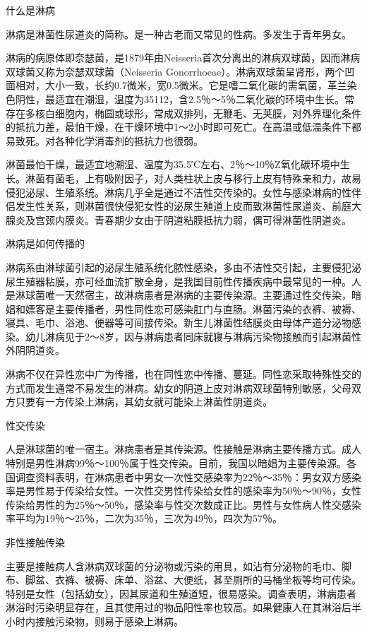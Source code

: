 \documentclass[12pt,UTF8]{ctexbook}
\begin{document}
什么是淋病


淋病是淋菌性尿道炎的简称。是一种古老而又常见的性病。多发生于青年男女。

淋病的病原体即奈瑟菌，是1879年由Neisseria首次分离出的淋病双球菌，因而淋病双球菌又称为奈瑟双球菌（Neisseria Gonorrhoeae）。淋病双球菌呈肾形，两个凹面相对，大小一致，长约0.7微米，宽0.5微米。它是嗜二氧化碳的需氧菌，革兰染色阴性，最适宜在潮湿，温度为35112，含2.5％～5％二氧化碳的环境中生长。常存在多核白细胞内，椭圆或球形，常成双排列，无鞭毛、无荚膜，对外界理化条件的抵抗力差，最怕干燥，在干燥环境中1～2小时即可死亡。在高温或低温条件下都易致死。对各种化学消毒剂的抵抗力也很弱。

淋菌最怕干燥，最适宜地潮湿、温度为35.5℃左右、2％～10％Z氧化碳环境中生长。淋菌有菌毛，上有吸附因子，对人类柱状上皮与移行上皮有特殊亲和力，故易侵犯泌尿、生殖系统。淋病几乎全是通过不洁性交传染的。女性与感染淋病的性伴侣发生性关系，则淋菌很快侵犯女性的泌尿生殖道上皮而致淋菌性尿道炎、前庭大腺炎及宫颈内膜炎。青春期少女由于阴道粘膜抵抗力弱，偶可得淋菌性阴道炎。





淋病是如何传播的


淋病系由淋球菌引起的泌尿生殖系统化脓性感染，多由不洁性交引起，主要侵犯泌尿生殖器粘膜，亦可经血流扩散全身，是我国目前性传播疾病中最常见的一种。人是淋球菌唯一天然宿主，故淋病患者是淋病的主要传染源。主要通过性交传染，暗娼和嫖客是主要传播者，男性同性恋可感染肛门与直肠。淋菌污染的衣裤、被褥、寝具、毛巾、浴池、便器等可间接传染。新生儿淋菌性结膜炎由母体产道分泌物感染。幼儿淋病见于2～8岁，因与淋病患者同床就寝与淋病污染物接触而引起淋菌性外阴阴道炎。

淋病不仅在异性恋中广为传播，也在同性恋中传播、蔓延。同性恋采取特殊性交的方式而发生通常不易发生的淋病。幼女的阴道上皮对淋病双球菌特别敏感，父母双方只要有一方传染上淋病，其幼女就可能染上淋菌性阴道炎。

性交传染

人是淋球菌的唯一宿主。淋病患者是其传染源。性接触是淋病主要传播方式。成人特别是男性淋病99％～100％属于性交传染。目前，我国以暗娼为主要传染源。各国调查资料表明，在淋病患者中男女一次性交感染率为22％～35％：男女双方感染率是男性易于传染给女性。一次性交男性传染给女性的感染率为50％～90％，女性传染给男性的为25％～50％，感染率与性交次数成正比。男性与女性病人性交感染率平均为19％～25％，二次为35％，三次为49％，四次为57％。

非性接触传染

主要是接触病人含淋病双球菌的分泌物或污染的用具，如沾有分泌物的毛巾、脚布、脚盆、衣裤、被褥、床单、浴盆、大便纸，甚至厕所的马桶坐板等均可传染。特别是女性（包括幼女），因其尿道和生殖道短，很易感染。调查表明，淋病患者淋浴时污染明显存在，且其使用过的物品阳性率也较高。如果健康人在其淋浴后半小时内接触污染物，则易于感染上淋病。
\end{document}
